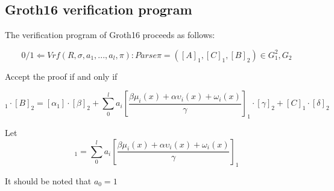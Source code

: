 \subsection{Groth16 verification program}

The verification program of Groth16\cite{website:Groth16} proceeds as follows:

\begin{equation}
0/1 \Leftarrow Vrf(R,\sigma, a_{1},...,a_{l}, \pi): Parse \pi = ([A]_{1}, [C]_{1}, [B]_{2}) \in G_1^2, G_2
\end{equation}

Accept the proof if and only if

\begin{equation}
 [A]_1 \cdot [B]_2 = [\alpha_1] \cdot [\beta]_2 + \sum_{0}^{l}a_i[\frac{\beta\mu_i(x) + \alpha\upsilon_i(x) + \omega_i(x)}{\gamma}]_1 \cdot [\gamma]_2 + [C]_1 \cdot [\delta]_2  
\end{equation}


Let \begin{equation}  [msm]_1 = \sum_{0}^{l}a_i[\frac{\beta\mu_i(x) + \alpha\upsilon_i(x) + \omega_i(x)}{\gamma}]_1 \end{equation}



It should be noted that $a_0 = 1$ 
